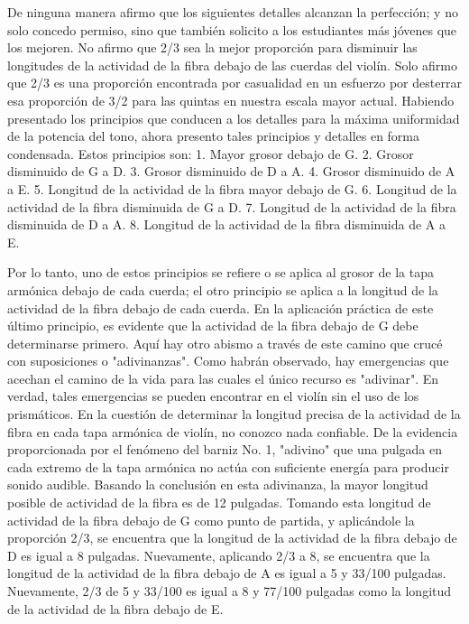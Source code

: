 \documentclass[12pt]{book}
\begin{document}
De ninguna manera afirmo que los siguientes detalles alcanzan la perfección; y no solo concedo permiso, sino que también solicito a los estudiantes más jóvenes que los mejoren. No afirmo que 2/3 sea la mejor proporción para disminuir las longitudes de la actividad de la fibra debajo de las cuerdas del violín. Solo afirmo que 2/3 es una proporción encontrada por casualidad en un esfuerzo por desterrar esa proporción de 3/2 para las quintas en nuestra escala mayor actual. Habiendo presentado los principios que conducen a los detalles para la máxima uniformidad de la potencia del tono, ahora presento tales principios y detalles en forma condensada. Estos principios son: 1. Mayor grosor debajo de G. 2. Grosor disminuido de G a D. 3. Grosor disminuido de D a A. 4. Grosor disminuido de A a E. 5. Longitud de la actividad de la fibra mayor debajo de G. 6. Longitud de la actividad de la fibra disminuida de G a D. 7. Longitud de la actividad de la fibra disminuida de D a A. 8. Longitud de la actividad de la fibra disminuida de A a E.

Por lo tanto, uno de estos principios se refiere o se aplica al grosor de la tapa armónica debajo de cada cuerda; el otro principio se aplica a la longitud de la actividad de la fibra debajo de cada cuerda. En la aplicación práctica de este último principio, es evidente que la actividad de la fibra debajo de G debe determinarse primero. Aquí hay otro abismo a través de este camino que crucé con suposiciones o "adivinanzas". Como habrán observado, hay emergencias que acechan el camino de la vida para las cuales el único recurso es "adivinar". En verdad, tales emergencias se pueden encontrar en el violín sin el uso de los prismáticos. En la cuestión de determinar la longitud precisa de la actividad de la fibra en cada tapa armónica de violín, no conozco nada confiable. De la evidencia proporcionada por el fenómeno del barniz No. 1, "adivino" que una pulgada en cada extremo de la tapa armónica no actúa con suficiente energía para producir sonido audible. Basando la conclusión en esta adivinanza, la mayor longitud posible de actividad de la fibra es de 12 pulgadas. Tomando esta longitud de actividad de la fibra debajo de G como punto de partida, y aplicándole la proporción 2/3, se encuentra que la longitud de la actividad de la fibra debajo de D es igual a 8 pulgadas. Nuevamente, aplicando 2/3 a 8, se encuentra que la longitud de la actividad de la fibra debajo de A es igual a 5 y 33/100 pulgadas. Nuevamente, 2/3 de 5 y 33/100 es igual a 8 y 77/100 pulgadas como la longitud de la actividad de la fibra debajo de E.
\end{document}
